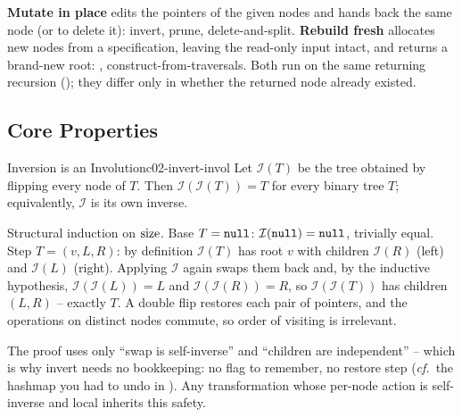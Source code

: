 \begin{notebox}
\textbf{Mutate in place} edits the pointers of the given nodes and hands back the
same node (or  to delete it): invert, prune, delete-and-split.
\textbf{Rebuild fresh} allocates new nodes from a specification, leaving the
read-only input intact, and returns a brand-new root: ,
construct-from-traversals. Both run on the same returning recursion
(); they differ only in whether the returned node
already existed.
\end{notebox}

\subsection{Core Properties}

\begin{theorem}{Inversion is an Involution}{c02-invert-invol}
Let $\mathcal{I}(T)$ be the tree obtained by flipping every node of $T$. Then
$\mathcal{I}(\mathcal{I}(T)) = T$ for every binary tree $T$; equivalently,
$\mathcal{I}$ is its own inverse.
\end{theorem}
\begin{proofbox}
Structural induction on $\operatorname{size}$. Base $T=\texttt{null}$: $\mathcal{I}(\texttt{null})=\texttt{null}$, trivially
equal. Step $T=(v,L,R)$: by definition $\mathcal{I}(T)$ has root $v$ with children
$\mathcal{I}(R)$ (left) and $\mathcal{I}(L)$ (right). Applying $\mathcal{I}$ again
swaps them back and, by the inductive hypothesis, $\mathcal{I}(\mathcal{I}(L))=L$
and $\mathcal{I}(\mathcal{I}(R))=R$, so $\mathcal{I}(\mathcal{I}(T))$ has children
$(L,R)$ -- exactly $T$. A double flip restores each pair of pointers, and the
operations on distinct nodes commute, so order of visiting is irrelevant.
\end{proofbox}
\begin{insightbox}
The proof uses only ``swap is self-inverse'' and ``children are independent'' --
which is why invert needs no bookkeeping: no flag to remember, no restore step
(\emph{cf.}~the hashmap you had to undo in ). Any transformation
whose per-node action is self-inverse and local inherits this safety.
\end{insightbox}

